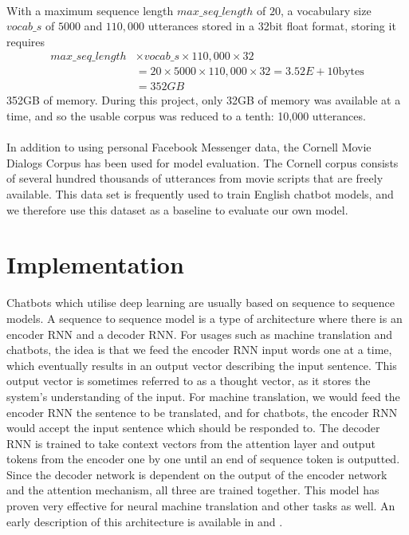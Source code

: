 \documentclass{article}
\begin{document}
\paragraph{}
With a maximum sequence length $max\_seq\_length$ of $20$, a vocabulary size
$vocab\_s$ of $5000$ and $110,000$ utterances stored in a 32bit float format,
storing it requires 
\begin{align*}
  max\_seq\_length &\times vocab\_s \times 110,000 \times 32\\
  &= 20 \times 5000 \times 110,000 \times 32 = 3.52E+10\text{bytes}\\
  &= 352 GB
\end{align*}
352GB of memory. During this project, only 32GB of memory was available at a
time, and so the usable corpus was reduced to a tenth: 10,000 utterances.

\paragraph{}
In addition to using personal Facebook Messenger data, the Cornell Movie
Dialogs Corpus \cite{cornell-corpus} has been used for model evaluation.
The Cornell corpus consists of several hundred thousands of utterances
from movie scripts that are freely available. This data set is frequently
used to train English chatbot models, and we therefore use this dataset
as a baseline to evaluate our own model.

\section*{Implementation}
Chatbots which utilise deep learning are usually based on sequence to sequence
models. A sequence to sequence model is a type of architecture where there is
an encoder RNN and a decoder RNN. For usages such as machine translation and
chatbots, the idea is that we feed the encoder RNN input words one at a time,
which eventually results in an output vector describing the input sentence.
This output vector is sometimes referred to as a thought vector, as it stores
the system's understanding of the input. For machine translation, we would feed
the encoder RNN the sentence to be translated, and for chatbots, the encoder
RNN would accept the input sentence which should be responded to. The decoder
RNN is trained to take context vectors from the attention layer and output
tokens from the encoder one by one until an end of sequence token is outputted.
Since the decoder network is dependent on the output of the encoder network and
the attention mechanism, all three are trained together. This model has proven
very effective for neural machine translation and other tasks as well. An early
description of this architecture is available in \cite{Cho2014} and
\cite{Bahdanau2015}.
\end{document}
